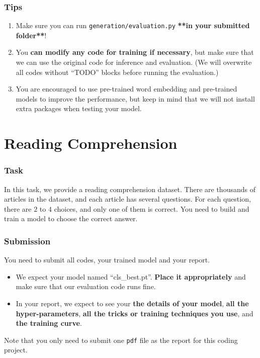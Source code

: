 \documentclass{article}
\begin{document}
\section{Tips}
\begin{enumerate}
    \item 
    Make sure you can run \texttt{generation/evaluation.py} \textbf{**in your submitted folder**}!
    \item
    You \textbf{can modify any code for training if necessary}, but make sure that we can use the original code for inference and evaluation. (We will overwrite all codes without ``TODO'' blocks before running the evaluation.)
    \item
    You are encouraged to use pre-trained word embedding and pre-trained
    models to improve the performance, but keep in mind that we will not
    install extra packages when testing your model.
\end{enumerate}


\part{Reading Comprehension}

\setcounter{section}{0}
\section{Task}

In this task, we provide a reading comprehension dataset. There are thousands of articles in the dataset, and each article has several questions. For each
question, there are $2$ to $4$ choices, and only one of them is correct. You need to
build and train a model to choose the correct answer.

\section{Submission}
You need to submit all codes, your trained model and your report.
\begin{itemize}
    \item 
    We expect your model named ``cls\_best.pt''. \textbf{Place it appropriately} and make sure that our evaluation code runs fine.
    \item
    In your report, we expect to see your \textbf{the details of your model},
    \textbf{all the hyper-parameters},
    \textbf{all the tricks or training techniques you use}, and \textbf{the training curve}.
\end{itemize}
Note that you only need to submit one \texttt{pdf} file as the report for this coding project.
\end{document}
